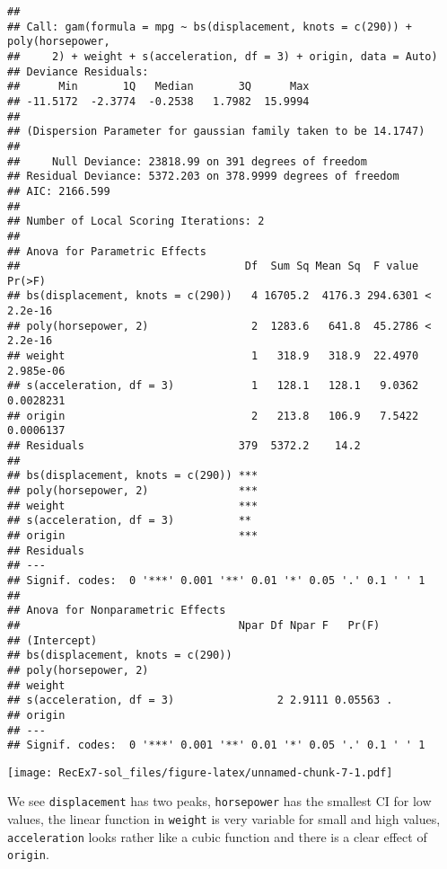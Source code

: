 \documentclass[]{article}
\begin{document}
\begin{verbatim}
## 
## Call: gam(formula = mpg ~ bs(displacement, knots = c(290)) + poly(horsepower, 
##     2) + weight + s(acceleration, df = 3) + origin, data = Auto)
## Deviance Residuals:
##      Min       1Q   Median       3Q      Max 
## -11.5172  -2.3774  -0.2538   1.7982  15.9994 
## 
## (Dispersion Parameter for gaussian family taken to be 14.1747)
## 
##     Null Deviance: 23818.99 on 391 degrees of freedom
## Residual Deviance: 5372.203 on 378.9999 degrees of freedom
## AIC: 2166.599 
## 
## Number of Local Scoring Iterations: 2 
## 
## Anova for Parametric Effects
##                                   Df  Sum Sq Mean Sq  F value    Pr(>F)
## bs(displacement, knots = c(290))   4 16705.2  4176.3 294.6301 < 2.2e-16
## poly(horsepower, 2)                2  1283.6   641.8  45.2786 < 2.2e-16
## weight                             1   318.9   318.9  22.4970 2.985e-06
## s(acceleration, df = 3)            1   128.1   128.1   9.0362 0.0028231
## origin                             2   213.8   106.9   7.5422 0.0006137
## Residuals                        379  5372.2    14.2                   
##                                     
## bs(displacement, knots = c(290)) ***
## poly(horsepower, 2)              ***
## weight                           ***
## s(acceleration, df = 3)          ** 
## origin                           ***
## Residuals                           
## ---
## Signif. codes:  0 '***' 0.001 '**' 0.01 '*' 0.05 '.' 0.1 ' ' 1
## 
## Anova for Nonparametric Effects
##                                  Npar Df Npar F   Pr(F)  
## (Intercept)                                              
## bs(displacement, knots = c(290))                         
## poly(horsepower, 2)                                      
## weight                                                   
## s(acceleration, df = 3)                2 2.9111 0.05563 .
## origin                                                   
## ---
## Signif. codes:  0 '***' 0.001 '**' 0.01 '*' 0.05 '.' 0.1 ' ' 1
\end{verbatim}

\texttt{[image: RecEx7-sol\_files/figure-latex/unnamed-chunk-7-1.pdf]}

We see \texttt{displacement} has two peaks, \texttt{horsepower} has the
smallest CI for low values, the linear function in \texttt{weight} is
very variable for small and high values, \texttt{acceleration} looks
rather like a cubic function and there is a clear effect of
\texttt{origin}.
\end{document}
